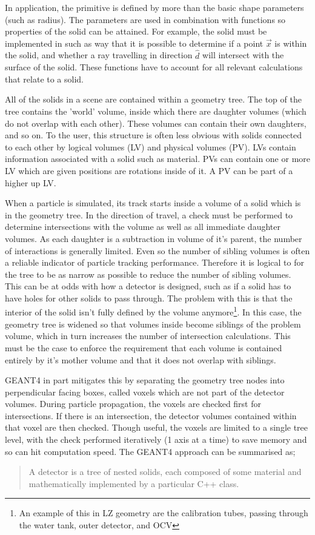 \par
In application, the primitive is defined by more than the basic shape parameters (such as radius).
The parameters are used in combination with functions so properties of the solid can be attained.
For example, the solid must be implemented in such as way that it is possible to determine if a point $\vec{x}$ is within the solid, and whether a ray travelling in direction $\hat{d}$ will intersect with the surface of the solid.
These functions have to account for all relevant calculations that relate to a solid.
\par
All of the solids in a scene are contained within a geometry tree.
The top of the tree contains the 'world' volume, inside which there are daughter volumes (which do not overlap with each other).
These volumes can contain their own daughters, and so on.
To the user, this structure is often less obvious with solids connected to each other by logical volumes (LV) and physical volumes (PV).
LVs contain information associated with a solid such as material. 
PVs can contain one or more LV which are given positions are rotations inside of it. 
A PV can be part of a higher up LV.
\par
When a particle is simulated, its track starts inside a volume of a solid which is in the geometry tree.
In the direction of travel, a check must be performed to determine intersections with the volume as well as all immediate daughter volumes.
As each daughter is a subtraction in volume of it's parent, the number of interactions is generally limited.
Even so the number of sibling volumes is often a reliable indicator of particle tracking performance.
Therefore it is logical to for the tree to be as narrow as possible to reduce the number of sibling volumes.
This can be at odds with how a detector is designed, such as if a solid has to have holes for other solids to pass through.
The problem with this is that the interior of the solid isn't fully defined by the volume anymore\footnote{An example of this in LZ geometry are the calibration tubes, passing through the water tank, outer detector, and OCV}.
In this case, the geometry tree is widened so that volumes inside become siblings of the problem volume, which in turn increases the number of intersection calculations.
This must be the case to enforce the requirement that each volume is contained entirely by it's mother volume and that it does not overlap with siblings.
\par
GEANT4 in part mitigates this by separating the geometry tree nodes into perpendicular facing boxes, called voxels \cite{geant4_voxel_ref} which are not part of the detector volumes.
During particle propagation, the voxels are checked first for intersections.
If there is an intersection, the detector volumes contained within that voxel are then checked.
Though useful, the voxels are limited to a single tree level, with the check performed iteratively (1 axis at a time) to save memory and so can hit computation speed.
The GEANT4 approach can be summarised as;
\begin{quote}
    A detector is a tree of nested solids, each composed of some material and mathematically implemented by a particular C++ class.
\end{quote}

